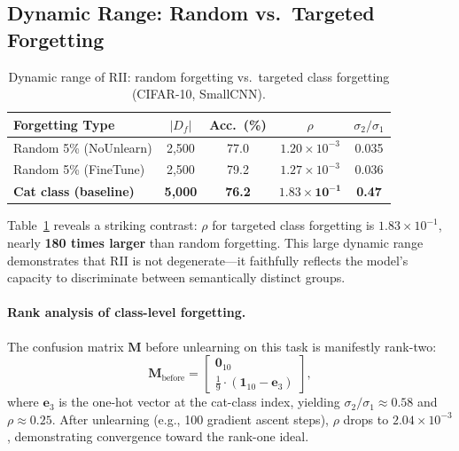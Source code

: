 \documentclass[journal]{IEEEtran}
\theoremstyle{definition}
\begin{document}
\subsection{Dynamic Range: Random vs.\ Targeted Forgetting}
\label{sec:dynamic_range}

\begin{table}[t]
\centering
\caption{Dynamic range of RII: random forgetting vs.\ targeted class forgetting (CIFAR-10, SmallCNN).}\label{tab:dynamic_range}
\setlength{\tabcolsep}{3pt}
\begin{tabular}{l c c c c}
\toprule
Forgetting Type & $|D_f|$ & Acc.\ (\%) & $\rho$ & $\sigma_2/\sigma_1$ \\
\midrule
Random 5\% (NoUnlearn) & 2,500 & 77.0 & $1.20{\times}10^{-3}$ & 0.035 \\
Random 5\% (FineTune)  & 2,500 & 79.2 & $1.27{\times}10^{-3}$ & 0.036 \\
\textbf{Cat class (baseline)} & \textbf{5,000} & \textbf{76.2} & $\mathbf{1.83{\times}10^{-1}}$ & \textbf{0.47} \\
\bottomrule
\end{tabular}
\end{table}

Table~\ref{tab:dynamic_range} reveals a striking contrast: $\rho$ for targeted class forgetting is $1.83\times 10^{-1}$, nearly \textbf{180 times larger} than random forgetting. This large dynamic range demonstrates that RII is not degenerate---it faithfully reflects the model's capacity to discriminate between semantically distinct groups.

\paragraph{Rank analysis of class-level forgetting.}
The confusion matrix $\mathbf{M}$ before unlearning on this task is manifestly rank-two:
\begin{equation}
\mathbf{M}_{\mathrm{before}} =
\begin{bmatrix}
\mathbf{0}_{10}                           \\
\frac19 \cdot (\mathbf{1}_{10} - \mathbf{e}_3)
\end{bmatrix},
\end{equation}
where $\mathbf{e}_3$ is the one-hot vector at the cat-class index, yielding $\sigma_2/\sigma_1 \approx 0.58$ and $\rho \approx 0.25$. After unlearning (e.g., 100 gradient ascent steps), $\rho$ drops to $2.04\times 10^{-3}$, demonstrating convergence toward the rank-one ideal.
\end{document}
